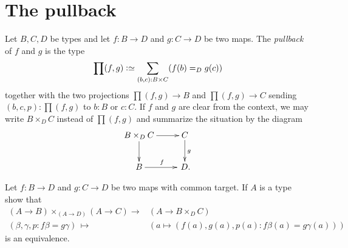 \section{The pullback}
\label{sec:pullback}

\begin{definition}
  \label{def:pullback}
  Let $B, C, D$ be types and let $f:B\to D$ and $g:C\to D$ be two maps.
The \emph{pullback} of $f$ and $g$ is the type
$$\prod(f,g)\defequi\sum_{(b,c):B\times C}(f(b)=_Dg(c))$$
together with the two projections $\prod(f,g)\to B$ and $\prod(f,g)\to C$ sending $(b,c,p):\prod(f,g)$ to $b:B$ or $c:C$.  If $f$ and $g$ are clear from the context, we may write $B\times_DC$ instead of $\prod(f,g)$ and summarize the situation by the diagram
$$\xymatrix{B\times_DC\ar[r]\ar[d]&C\ar[d]^g\\B\ar[r]^f&\,D.}$$
\end{definition}
\begin{xca}
  \label{xca:univpropofpullback}
  Let $f:B\to D$ and $g:C\to D$ be two maps with common target.  If $A$ is a type show that
  \begin{align*}
    (A\to B)\times_{(A\to D)}(A\to C)\to &(A\to B\times_DC)\\
(\beta,\gamma,p:f\beta=g\gamma)\,\mapsto\,&(a\mapsto (f(a),g(a),p(a):f\beta(a)=g\gamma(a)))
  \end{align*}
 is an equivalence.
\end{xca}

